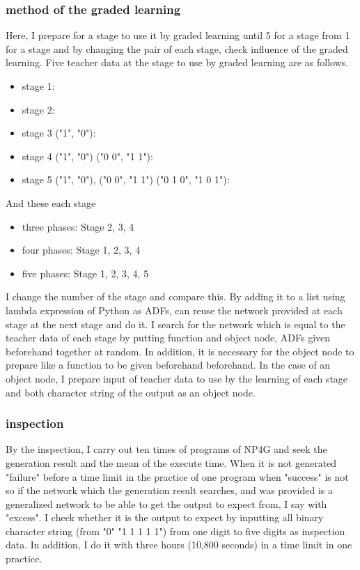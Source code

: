 \documentclass{article}
\begin{document}
\subsubsection {method of the graded learning}
\label{sec:PLhow}
Here, I prepare for a stage to use it by graded learning until 5 for a stage from 1 for a stage and by changing the pair of each stage, check influence of the graded learning.
Five teacher data at the stage to use by graded learning are as follows.
\begin{itemize}
\item stage 1:
\item stage 2:
\item stage 3 ("1", "0"):
\item stage 4 ("1", "0") ("0 0", "1 1"):
\item stage 5 ("1", "0"), ("0 0", "1 1") ("0 1 0", "1 0 1"):
\end{itemize}
And these each stage
\begin{itemize}
\item three phases:
Stage 2, 3, 4
\item four phases:
Stage 1, 2, 3, 4
\item five phases:
Stage 1, 2, 3, 4, 5
\end{itemize}
\noindent
I change the number of the stage and compare this.
By adding it to a list using lambda expression of Python as ADFs, can reuse the network provided at each stage at the next stage and do it.
I search for the network which is equal to the teacher data of each stage by putting function and object node, ADFs given beforehand together at random.
In addition, it is necessary for the object node to prepare like a function to be given beforehand beforehand.
In the case of an object node, I prepare input of teacher data to use by the learning of each stage and both character string of the output as an object node.
\subsubsection {inspection}
By the inspection, I carry out ten times of programs of NP4G and seek the generation result and the mean of the execute time.
When it is not generated "failure" before a time limit in the practice of one program when "success" is not so if the network which the generation result searches, and was provided is a generalized network to be able to get the output to expect from, I say with "excess".
I check whether it is the output to expect by inputting all binary character string (from "0" "1 1 1 1 1") from one digit to five digits as inspection data.
In addition, I do it with three hours (10,800 seconds) in a time limit in one practice.
\end{document}
